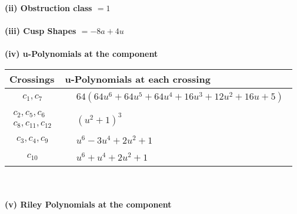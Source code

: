 \documentclass[1p]{elsarticle_modified}
\theoremstyle{definition}
\begin{document}
\flushleft \textbf{(ii) Obstruction class $= 1$}\\~\\
\flushleft \textbf{(iii) Cusp Shapes $= -8 a+4 u$}\\~\\
\newpage\renewcommand{\arraystretch}{1}
\flushleft \textbf{(iv) u-Polynomials at the component}\newline \\
\begin{tabular}{m{50pt}|m{274pt}}
Crossings & \hspace{64pt}u-Polynomials at each crossing \\
\hline $$\begin{aligned}c_{1},c_{7}\end{aligned}$$&$\begin{aligned}
&64(64 u^6+64 u^5+64 u^4+16 u^3+12 u^2+16 u+5)
\end{aligned}$\\
\hline $$\begin{aligned}c_{2},c_{5},c_{6}\\c_{8},c_{11},c_{12}\end{aligned}$$&$\begin{aligned}
&(u^2+1)^3
\end{aligned}$\\
\hline $$\begin{aligned}c_{3},c_{4},c_{9}\end{aligned}$$&$\begin{aligned}
&u^6-3 u^4+2 u^2+1
\end{aligned}$\\
\hline $$\begin{aligned}c_{10}\end{aligned}$$&$\begin{aligned}
&u^6+u^4+2 u^2+1
\end{aligned}$\\
\hline
\end{tabular}\\~\\
\newpage\renewcommand{\arraystretch}{1}
\flushleft \textbf{(v) Riley Polynomials at the component}\newline \\
\end{document}
